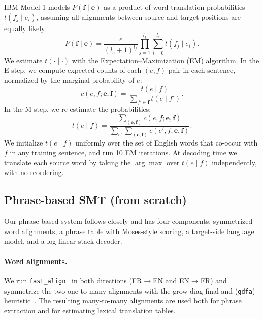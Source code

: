 \documentclass[11pt]{article}
\begin{document}
IBM Model 1 models $P(\mathbf{f} \mid \mathbf{e})$ as a product of word translation probabilities $t(f_j \mid e_i)$, assuming all alignments between source and target positions are equally likely:
\begin{equation}
P(\mathbf{f} \mid \mathbf{e}) = \frac{\epsilon}{(l_e + 1)^{l_f}} \prod_{j=1}^{l_f} \sum_{i=0}^{l_e} t(f_j \mid e_i).
\end{equation}
We estimate $t(\cdot \mid \cdot)$ with the Expectation--Maximization (EM) algorithm. In the E-step, we compute expected counts of each $(e, f)$ pair in each sentence, normalized by the marginal probability of $e$:
\begin{equation}
c(e, f; \mathbf{e}, \mathbf{f}) = \frac{t(e \mid f)}{\sum_{f' \in \mathbf{f}} t(e \mid f')}.
\end{equation}
In the M-step, we re-estimate the probabilities:
\begin{equation}
t(e \mid f) = \frac{\sum_{(\mathbf{e}, \mathbf{f})} c(e, f; \mathbf{e}, \mathbf{f})}{\sum_{e'} \sum_{(\mathbf{e}, \mathbf{f})} c(e', f; \mathbf{e}, \mathbf{f})}.
\end{equation}
We initialize $t(e \mid f)$ uniformly over the set of English words that co-occur with $f$ in any training sentence, and run 10 EM iterations. At decoding time we translate each source word by taking the $\arg\max$ over $t(e \mid f)$ independently, with no reordering.
 
\subsection{Phrase-based SMT (from scratch)}
\label{sec:phrase}

Our phrase-based system follows \citet{koehn-etal-2003-statistical} closely and has four components: symmetrized word alignments, a phrase table with Moses-style scoring, a target-side language model, and a log-linear stack decoder.

\paragraph{Word alignments.} We run \texttt{fast\_align}~\cite{dyer-etal-2013-simple} in both directions (FR$\rightarrow$EN and EN$\rightarrow$FR) and symmetrize the two one-to-many alignments with the grow-diag-final-and (\texttt{gdfa}) heuristic~\cite{och-ney-2003-systematic,koehn-etal-2005-edinburgh}. The resulting many-to-many alignments are used both for phrase extraction and for estimating lexical translation tables.
\end{document}
